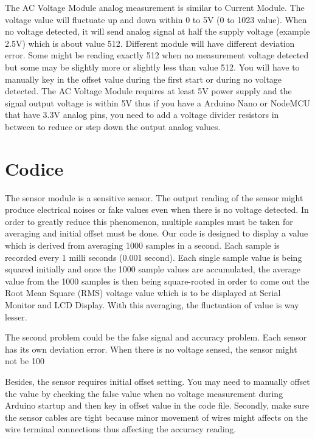 \documentclass[italian,12pt,a4paper,oneside,final]{report}
\begin{document}
The AC Voltage Module analog measurement is similar to Current Module. The voltage value will fluctuate up and down within 0 to 5V (0 to 1023 value). When no voltage detected, it will send analog signal at half the supply voltage (example 2.5V) which is about value 512. Different module will have different deviation error. Some might be reading exactly 512 when no measurement voltage detected but some may be slightly more or slightly less than value 512. You will have to manually key in the offset value during the first start or during no voltage detected. The AC Voltage Module requires at least 5V power supply and the signal output voltage is within 5V thus if you have a Arduino Nano or NodeMCU that have 3.3V analog pins, you need to add a voltage divider resistors in between to reduce or step down the output analog values.


\section{Codice}


The sensor module is a sensitive sensor. The output reading of the sensor might produce electrical noises or fake values even when there is no voltage detected. In order to greatly reduce this phenomenon, multiple samples must be taken for averaging and initial offset must be done. Our code is designed to display a value which is derived from averaging 1000 samples in a second. Each sample is recorded every 1 milli seconds (0.001 second). Each single sample value is being squared initially and once the 1000 sample values are accumulated, the average value from the 1000 samples is then being square-rooted in order to come out the Root Mean Square (RMS) voltage value which is to be displayed at Serial Monitor and LCD Display. With this averaging, the fluctuation of value is way lesser.

The second problem could be the false signal and accuracy problem. Each sensor has its own deviation error. When there is no voltage sensed, the sensor might not be 100%

Besides, the sensor requires initial offset setting. You may need to manually offset the value by checking the false value when no voltage measurement during Arduino startup and then key in offset value in the code file. Secondly, make sure the sensor cables are tight because minor movement of wires might affects on the wire terminal connections thus affecting the accuracy reading.
\end{document}
